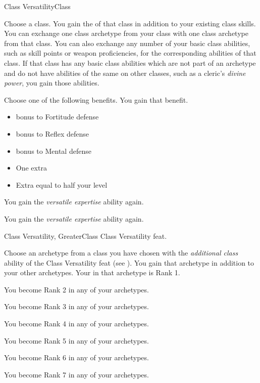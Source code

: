     \begin{feat}{Class Versatility}{Class}

         Choose a class.
        You gain the  of that class in addition to your existing class skills.
        You can exchange one class archetype from your class with one class archetype from that class.
        You can also exchange any number of your basic class abilities, such as skill points or weapon proficiencies, for the corresponding abilities of that class.
        If that class has any basic class abilities which are not part of an archetype and do not have abilities of the same on other classes, such as a cleric's \textit{divine power}, you gain those abilities.

         Choose one of the following benefits.
        You gain that benefit.
        \begin{itemize}
            \item {} bonus to Fortitude defense
            \item {} bonus to Reflex defense
            \item {} bonus to Mental defense
            \item One extra 
            \item Extra  equal to half your level
        \end{itemize}

         You gain the \textit{versatile expertise} ability again.

         You gain the \textit{versatile expertise} ability again.
    \end{feat}

    \begin{feat}{Class Versatility, Greater}{Class}
        \featpre Class Versatility feat.

         Choose an archetype from a class you have chosen with the \textit{additional class} ability of the Class Versatility feat (see ).
        You gain that archetype in addition to your other archetypes.
        Your  in that archetype is Rank 1.

         You become Rank 2 in any of your archetypes.

         You become Rank 3 in any of your archetypes.

         You become Rank 4 in any of your archetypes.

         You become Rank 5 in any of your archetypes.

         You become Rank 6 in any of your archetypes.

         You become Rank 7 in any of your archetypes.
    \end{feat}

